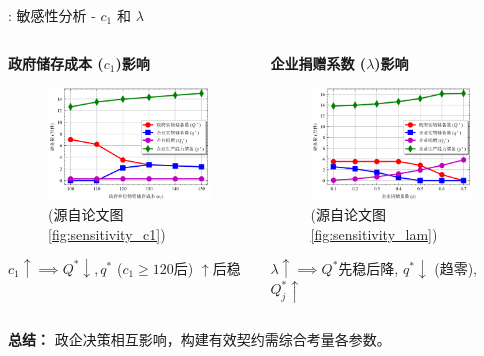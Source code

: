 \documentclass[9pt]{beamer}
\begin{document}
\begin{frame}{\insertsectionhead: 敏感性分析 - $c_1$ 和 $\lambda$}
    \begin{columns}[T]
        \begin{column}{0.5\textwidth}
            \textbf{政府储存成本 ($c_1$)影响}
            \begin{figure}
                \includegraphics[width=\linewidth]{basic_pictures/sensitivity_c1.png}
                \caption*{(源自论文图 \ref{fig:sensitivity_c1})}
            \end{figure}
            \footnotesize $c_1 \uparrow \implies Q^* \downarrow, q^*$ ($c_1 \ge 120$后) $\uparrow$后稳
        \end{column}
        \begin{column}{0.5\textwidth}
            \textbf{企业捐赠系数 ($\lambda$)影响}
            \begin{figure}
                \includegraphics[width=\linewidth]{basic_pictures/sensitivity_lam.png}
                \caption*{(源自论文图 \ref{fig:sensitivity_lam})}
            \end{figure}
            \footnotesize $\lambda \uparrow \implies Q^*$先稳后降, $q^* \downarrow$ (趋零), $Q_j^* \uparrow$
        \end{column}
    \end{columns}
    \textbf{总结：} 政企决策相互影响，构建有效契约需综合考量各参数。
\end{frame}
\end{document}

